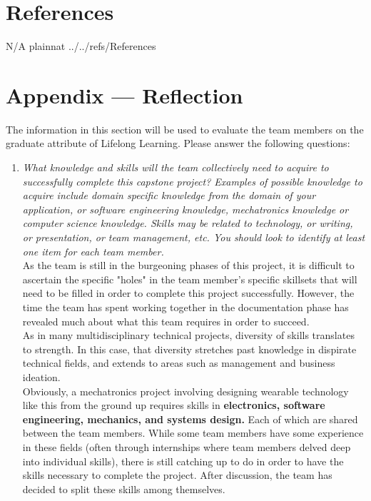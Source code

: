 \documentclass[12pt]{article}
\begin{document}
\section{References}
\label{References}
N/A
 {plainnat}
 {../../refs/References}

\section*{Appendix --- Reflection}

The information in this section will be used to evaluate the team members on the
graduate attribute of Lifelong Learning.  Please answer the following questions:

\begin{enumerate}
  \item \textit{What knowledge and skills will the team collectively need to acquire to
        successfully complete this capstone project?  Examples of possible knowledge
        to acquire include domain specific knowledge from the domain of your
        application, or software engineering knowledge, mechatronics knowledge or
        computer science knowledge.  Skills may be related to technology, or writing,
        or presentation, or team management, etc.  You should look to identify at
        least one item for each team member.}\\

	As the team is still in the burgeoning phases of this project, it is difficult to ascertain the specific "holes" in the team member's specific skillsets that will need to be filled in order to complete this project successfully. However, the time the team has spent working together in the documentation phase has revealed much about what this team requires in order to succeed. \\

As in many multidisciplinary technical projects, diversity of skills translates to strength. In this case, that diversity stretches past knowledge in dispirate technical fields, and extends to areas such as management and business ideation.\\

Obviously, a mechatronics project involving designing wearable technology like this from the ground up requires skills in \textbf{electronics, software engineering, mechanics, and systems design.} Each of which are shared between the team members. While some team members have some experience in these fields (often through internships where team members delved deep into individual skills), there is still catching up to do in order to have the skills necessary to complete the project. After discussion, the team has decided to split these skills among themselves.\\


\end{enumerate}
\end{document}
